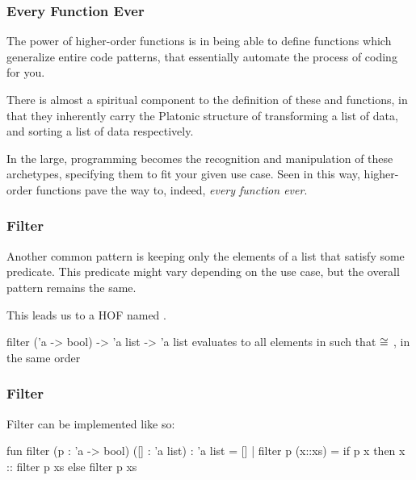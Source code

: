 \documentclass[aspectratio=169, handout]{beamer}
\begin{document}
\begin{frame}[fragile]
  \frametitle{Every Function Ever}

  The power of higher-order functions is in being able to define functions
  which generalize entire code patterns, that essentially automate the process
  of coding for you.

  \pause
  \vspace{\fill}

  There is almost a spiritual component to the definition of these 
   and  functions, in that they inherently carry the
  Platonic structure of transforming a list of data, and sorting a list of 
  data respectively.

  \pause
  \vspace{\fill}

  In the large, programming becomes the recognition and manipulation of these 
  archetypes, specifying them to fit your given use case. Seen in this way,
  higher-order functions pave the way to, indeed, \textit{every function ever}.
\end{frame}


\begin{frame}[fragile]
  \frametitle{Filter}

  Another common pattern is keeping only the elements of a list that satisfy
  some predicate. This predicate might vary depending on the use case, but 
  the overall pattern remains the same.

  \pause
  \vspace{\fill}

  This leads us to a HOF named .

  \pause
  \vspace{\fill}

  \spec
    {filter}
    {('a -> bool) -> 'a list -> 'a list}
    {}
    { evaluates to all elements  in 
    such that  $\cong$ , in the same order}
\end{frame}

\begin{frame}[fragile]
  \frametitle{Filter}

  Filter can be implemented like so:

  \pause
  \begin{codeblock}
    fun filter (p : 'a -> bool) ([] : 'a list) : 'a list = []
      | filter p (x::xs) =
          if p x then
            x :: filter p xs
          else
            filter p xs
  \end{codeblock}
\end{frame}
\end{document}

